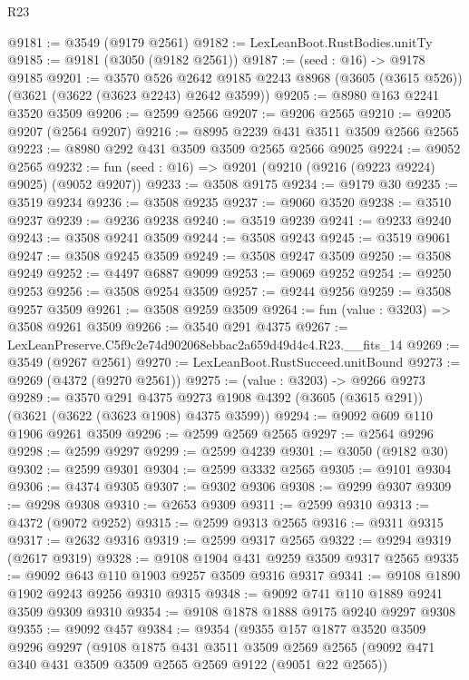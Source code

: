 \begin{lexlean}{R23}
\begin{coremodule}
@9181 := @3549 (@9179 @2561)
@9182 := LexLeanBoot.RustBodies.unitTy
@9185 := @9181 (@3050 (@9182 @2561))
@9187 := (seed : @16) -> @9178 @9185
@9201 := @3570
    @526
    @2642
    @9185
    @2243
    @8968
    (@3605 (@3615 @526))
    (@3621 (@3622 (@3623 @2243) @2642 @3599))
@9205 := @8980 @163 @2241 @3520 @3509
@9206 := @2599 @2566
@9207 := @9206 @2565
@9210 := @9205 @9207 (@2564 @9207)
@9216 := @8995 @2239 @431 @3511 @3509 @2566 @2565
@9223 := @8980 @292 @431 @3509 @3509 @2565 @2566 @9025
@9224 := @9052 @2565
@9232 := fun (seed : @16) => @9201 (@9210 (@9216 (@9223 @9224) @9025) (@9052 @9207))
@9233 := @3508 @9175
@9234 := @9179 @30
@9235 := @3519 @9234
@9236 := @3508 @9235
@9237 := @9060 @3520
@9238 := @3510 @9237
@9239 := @9236 @9238
@9240 := @3519 @9239
@9241 := @9233 @9240
@9243 := @3508 @9241 @3509
@9244 := @3508 @9243
@9245 := @3519 @9061
@9247 := @3508 @9245 @3509
@9249 := @3508 @9247 @3509
@9250 := @3508 @9249
@9252 := @4497 @6887 @9099
@9253 := @9069 @9252
@9254 := @9250 @9253
@9256 := @3508 @9254 @3509
@9257 := @9244 @9256
@9259 := @3508 @9257 @3509
@9261 := @3508 @9259 @3509
@9264 := fun (value : @3203) => @3508 @9261 @3509
@9266 := @3540 @291 @4375
@9267 := LexLeanPreserve.C5f9c2e74d902068ebbac2a659d49d4c4.R23.__fits_14
@9269 := @3549 (@9267 @2561)
@9270 := LexLeanBoot.RustSucceed.unitBound
@9273 := @9269 (@4372 (@9270 @2561))
@9275 := (value : @3203) -> @9266 @9273
@9289 := @3570
    @291
    @4375
    @9273
    @1908
    @4392
    (@3605 (@3615 @291))
    (@3621 (@3622 (@3623 @1908) @4375 @3599))
@9294 := @9092 @609 @110 @1906 @9261 @3509
@9296 := @2599 @2569 @2565
@9297 := @2564 @9296
@9298 := @2599 @9297
@9299 := @2599 @4239
@9301 := @3050 (@9182 @30)
@9302 := @2599 @9301
@9304 := @2599 @3332 @2565
@9305 := @9101 @9304
@9306 := @4374 @9305
@9307 := @9302 @9306
@9308 := @9299 @9307
@9309 := @9298 @9308
@9310 := @2653 @9309
@9311 := @2599 @9310
@9313 := @4372 (@9072 @9252)
@9315 := @2599 @9313 @2565
@9316 := @9311 @9315
@9317 := @2632 @9316
@9319 := @2599 @9317 @2565
@9322 := @9294 @9319 (@2617 @9319)
@9328 := @9108 @1904 @431 @9259 @3509 @9317 @2565
@9335 := @9092 @643 @110 @1903 @9257 @3509 @9316 @9317
@9341 := @9108 @1890 @1902 @9243 @9256 @9310 @9315
@9348 := @9092 @741 @110 @1889 @9241 @3509 @9309 @9310
@9354 := @9108 @1878 @1888 @9175 @9240 @9297 @9308
@9355 := @9092 @457
@9384 := @9354
    (@9355
      @157
      @1877
      @3520
      @3509
      @9296
      @9297
      (@9108
        @1875
        @431
        @3511
        @3509
        @2569
        @2565
        (@9092 @471 @340 @431 @3509 @3509 @2565 @2569 @9122 (@9051 @22 @2565))

\end{coremodule}
\end{lexlean}
